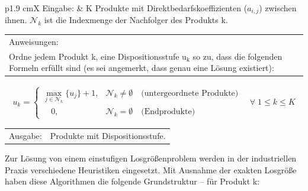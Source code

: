
\begin{algorithmic}
\label{algo:Algorithmus_Dispositionsstufen}
    \STATE
    \begin{tabularx}{\linewidth}{p{1.9 cm}X}
        Eingabe: & K Produkte mit Direktbedarfskoeffizienten ($a_{i,j}$) zwischen ihnen. $\mathcal{N}_{k}$ ist die Indexmenge der Nachfolger des Produkts k.
    \end{tabularx}
    \addtocounter{table}{-1} %
    \begin{tabularx}{\linewidth}{X}
    Anweisungen: \\
    Ordne jedem Produkt k, eine Dispositionsstufe $\mathrm{u_{k}}$ so zu, dass die folgenden Formeln erfüllt sind (es sei angemerkt, dass genau eine Lösung existiert):
    \end{tabularx}
    \addtocounter{table}{-1} %
    \vspace{-1,0cm}
    \begin{fleqn}[0,5cm]
        \begin{align*}
        u_{k} = \begin{cases}	 \max\limits_{j \in \mathcal{N}_{k}}  \{u_{j}\}+1,
        & \mathcal{N}_{k} \ne \emptyset
        \quad \text{(untergeordnete Produkte)}  \\
        \quad 0,    	   & \mathcal{N}_{k}   = \emptyset \quad \text{(Endprodukte)}
        \end{cases} \quad \forall\; 1 \le k \le K
        \end{align*}
    \end{fleqn}
    \begin{tabularx}{\linewidth}{p{1.9 cm}X}
        \hspace*{1 mm} Ausgabe: & Produkte mit Dispositionsstufe.
    \end{tabularx}
    \addtocounter{table}{-1} %
\end{algorithmic}

\vspace{\baselineskip} 

Zur Lösung von einem einstufigen Losgrößenproblem werden in der industriellen Praxis verschiedene Heuristiken eingesetzt. Mit Ausnahme der exakten Losgröße haben diese Algorithmen die folgende Grundstruktur -- für Produkt k: \\

